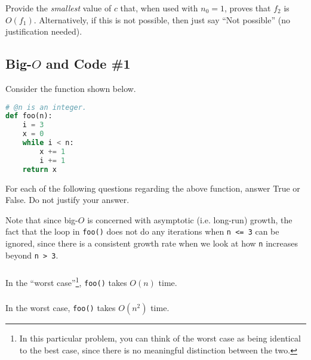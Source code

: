 \documentclass{article}
\begin{document}
Provide the \textit{smallest} value of $c$ that, when used with $n_0 = 1$, proves that $f_2$ is $O(f_1)$. Alternatively, if this is not possible, then just say ``Not possible'' (no justification needed).

\begin{mdframed}
\vspace{3em}
\end{mdframed}

\subsection{Big-$O$ and Code \#1}

Consider the function shown below.

\begin{lstlisting}[language=Python]
# @n is an integer.
def foo(n):
    i = 3
    x = 0
    while i < n:
        x += 1
        i += 1
    return x
\end{lstlisting}

For each of the following questions regarding the above function, answer True or False. Do not justify your answer.

Note that since big-$O$ is concerned with asymptotic (i.e. long-run) growth, the fact that the loop in \lstinline{foo()} does not do any iterations when \lstinline{n <= 3} can be ignored, since there is a consistent growth rate when we look at how \lstinline{n} increases beyond \lstinline{n > 3}.

\subsubsection{}

In the ``worst case''\footnote{In this particular problem, you can think of the worst case as being identical to the best case, since there is no meaningful distinction between the two.}, \lstinline{foo()} takes $O(n)$ time.

\begin{mdframed}
\vspace{3em}
\end{mdframed}

\subsubsection{}

In the worst case, \lstinline{foo()} takes $O(n^2)$ time.

\begin{mdframed}
\vspace{3em}
\end{mdframed}
\end{document}
